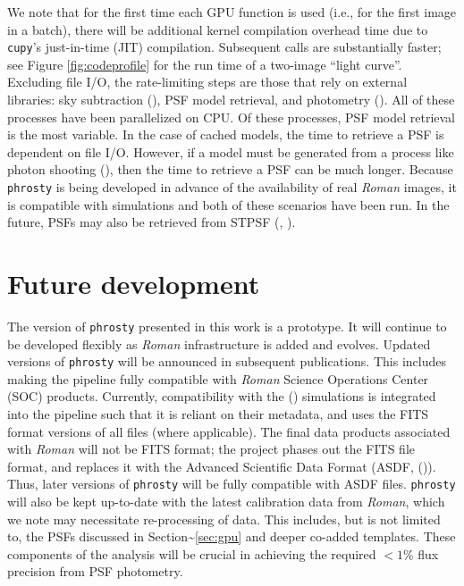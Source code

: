 \documentclass[10pt,a4paper,onecolumn]{article}
\begin{document}
We note that for the first time each GPU function is used (i.e., for the
first image in a batch), there will be additional kernel compilation
overhead time due to \texttt{cupy}'s just-in-time (JIT) compilation.
Subsequent calls are substantially faster; see Figure
\ref{fig:codeprofile} for the run time of a two-image ``light curve''.
Excluding file I/O, the rate-limiting steps are those that rely on
external libraries: sky subtraction
(), PSF model
retrieval, and photometry (). All of these processes have been parallelized on CPU. Of these
processes, PSF model retrieval is the most variable. In the case of
cached models, the time to retrieve a PSF is dependent on file I/O.
However, if a model must be generated from a process like photon
shooting (), then
the time to retrieve a PSF can be much longer. Because \texttt{phrosty}
is being developed in advance of the availability of real \emph{Roman}
images, it is compatible with simulations and both of these scenarios
have been run. In the future, PSFs may also be retrieved from STPSF
(,
).

\section{Future development}\label{future-development}

The version of \texttt{phrosty} presented in this work is a prototype.
It will continue to be developed flexibly as \emph{Roman} infrastructure
is added and evolves. Updated versions of \texttt{phrosty} will be
announced in subsequent publications. This includes making the pipeline
fully compatible with \emph{Roman} Science Operations Center (SOC)
products. Currently, compatibility with the
() simulations is
integrated into the pipeline such that it is reliant on their metadata,
and uses the FITS format versions of all files (where applicable). The
final data products associated with \emph{Roman} will not be FITS
format; the project phases out the FITS file format, and replaces it
with the Advanced Scientific Data Format (ASDF,
()). Thus, later versions of
\texttt{phrosty} will be fully compatible with ASDF files.
\texttt{phrosty} will also be kept up-to-date with the latest
calibration data from \emph{Roman}, which we note may necessitate
re-processing of data. This includes, but is not limited to, the PSFs
discussed in Section\textasciitilde{}\ref{sec:gpu} and deeper co-added
templates. These components of the analysis will be crucial in achieving
the required \(<1\%\) flux precision from PSF photometry.
\end{document}
